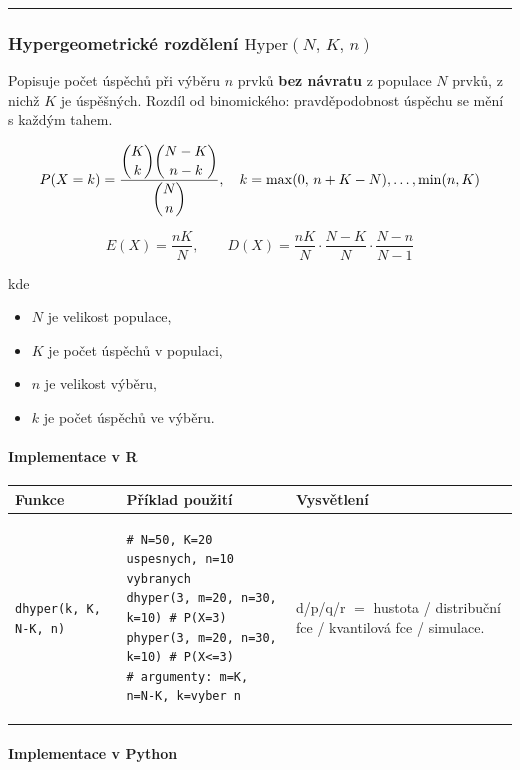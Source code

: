 \documentclass[a4paper, 11pt]{article}
\newenvironment{funkcedict}
{%
  \begingroup
  \renewcommand{\arraystretch}{1.4}%
  \lstset{basicstyle=\ttfamily\small, columns=fullflexible}%
  \setlength{\tabcolsep}{4pt}%
  \begin{tabular}{p{0.19\textwidth} p{0.38\textwidth} p{0.30\textwidth}}
  \textbf{Funkce} & \textbf{Příklad použití} & \textbf{Vysvětlení} \\
  \midrule
}
{%
  \end{tabular}%
  \endgroup
}
\begin{document}
\noindent\hrule\medskip

\subsubsection{Hypergeometrické rozdělení $\mathrm{Hyper}(N,\,K,\,n)$}

Popisuje počet úspěchů při výběru $n$ prvků \textbf{bez návratu}
z populace $N$ prvků, z nichž $K$ je úspěšných. Rozdíl od binomického:
pravděpodobnost úspěchu se mění s každým tahem.

\begin{equation*}
	P(X = k) = \frac{\dbinom{K}{k}\dbinom{N-K}{n-k}}{\dbinom{N}{n}},
	\quad k = \max(0,\,n+K-N), \ldots, \min(n,K)
\end{equation*}

\begin{equation*}
	E(X) = \frac{nK}{N}, \qquad
	D(X) = \frac{nK}{N}\cdot\frac{N-K}{N}\cdot\frac{N-n}{N-1}
\end{equation*}

kde

\begin{itemize}[noitemsep]
	\item $N$ je velikost populace,
	\item $K$ je počet úspěchů v populaci,
	\item $n$ je velikost výběru,
	\item $k$ je počet úspěchů ve výběru.
\end{itemize}

\paragraph{Implementace v R}\mbox{}\par

\begin{funkcedict}

	\texttt{dhyper(k, K, N-K, n)} &
	\begin{lstlisting}
# N=50, K=20 uspesnych, n=10 vybranych
dhyper(3, m=20, n=30, k=10) # P(X=3)
phyper(3, m=20, n=30, k=10) # P(X<=3)
# argumenty: m=K, n=N-K, k=vyber n
	\end{lstlisting}
	&
	d/p/q/r $=$ hustota / distribuční fce / kvantilová fce / simulace. \\

\end{funkcedict}

\paragraph{Implementace v Python}\mbox{}\par
\end{document}

